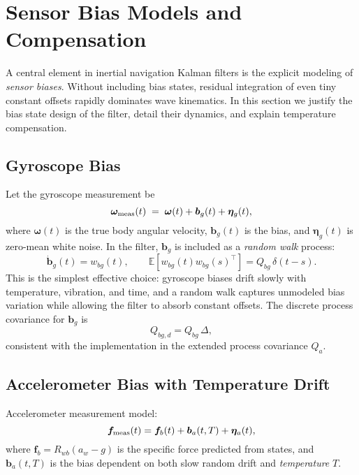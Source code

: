 \documentclass[10pt]{extarticle}
\begin{document}
\section{Sensor Bias Models and Compensation}
\label{sec:biases}

A central element in inertial navigation Kalman filters is the explicit modeling of 
\emph{sensor biases}. Without including bias states, residual integration of even tiny 
constant offsets rapidly dominates wave kinematics. In this section we justify the bias 
state design of the filter, detail their dynamics, and explain temperature compensation.

\subsection{Gyroscope Bias}
Let the gyroscope measurement be
\begin{equation}
\bm\omega_{\rm meas}(t) \;=\; \bm\omega(t) + \bm b_g(t) + \bm\eta_g(t),
\label{eq:gyro-meas}
\end{equation}
where $\bm\omega(t)$ is the true body angular velocity, $\bm b_g(t)$ is the bias,
and $\bm\eta_g(t)$ is zero-mean white noise. In the filter, $\bm b_g$ is included as
a \emph{random walk} process:
\begin{equation}
\dot{\bm b}_g(t) = w_{bg}(t),\qquad
\mathbb{E}[w_{bg}(t)w_{bg}(s)^\top] = Q_{bg}\,\delta(t-s).
\label{eq:gyro-bias-model}
\end{equation}
This is the simplest effective choice: gyroscope biases drift slowly with temperature, vibration,
and time, and a random walk captures unmodeled bias variation while allowing the filter to absorb
constant offsets. The discrete process covariance for $\bm b_g$ is
\begin{equation}
Q_{bg,d} = Q_{bg}\,\Delta,
\label{eq:gyro-bias-qd}
\end{equation}
consistent with the implementation in the extended process covariance $Q_a$.

\subsection{Accelerometer Bias with Temperature Drift}
Accelerometer measurement model:
\begin{equation}
\bm f_{\rm meas}(t) = \bm f_b(t) + \bm b_a(t,T) + \bm\eta_a(t),
\label{eq:acc-meas}
\end{equation}
where $\bm f_b=R_{wb}(a_w-g)$ is the specific force predicted from states, and 
$\bm b_a(t,T)$ is the bias dependent on both slow random drift and \emph{temperature} $T$.
\end{document}
